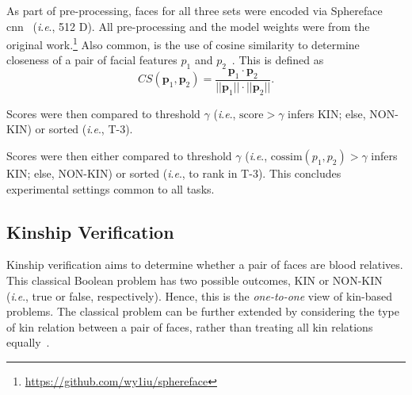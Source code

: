 \documentclass[letterpaper, 10 pt, conference]{ieeeconf}
\newcommand{\ie}{\textit{i}.\textit{e}., }
\begin{document}





As part of pre-processing, faces for all three sets were encoded via Sphereface \ac{cnn}~\cite{Liu_2017_CVPR}  (\ie 512 D). All pre-processing and the model weights were from the original work.\footnote{\href{https://github.com/wy1iu/sphereface}{https://github.com/wy1iu/sphereface}} Also common, is the use of cosine similarity to determine closeness of a pair of facial features $p_1$ and $p_2$~\cite{nguyen2010cosine}. This is defined as
$$
CS(\pmb p_1, \pmb p_2) = \frac {\pmb p_1 \cdot \pmb p_2}{||\pmb p_1|| \cdot ||\pmb p_2||}.
$$ 


Scores were then compared to threshold $\gamma$ (\ie $\text{score} > \gamma$ infers KIN; else, NON-KIN) or sorted (\ie T-3).


Scores were then either compared to threshold $\gamma$ (\ie $\text{cossim}(p_1, p_2) > \gamma$ infers KIN; else, NON-KIN) or sorted (\ie to rank in T-3). This concludes experimental settings common to all tasks.



\subsection{Kinship Verification}\label{sec:kinver}

Kinship verification aims to determine whether a pair of faces are blood relatives. This classical Boolean problem has two possible outcomes, KIN or NON-KIN (\ie true or false, respectively). Hence, this is the \textit{one-to-one} view of kin-based problems. The classical problem can be further extended by considering the type of kin relation between a pair of faces, rather than treating all kin relations equally~\cite{robinson2018recognize}.
\end{document}
